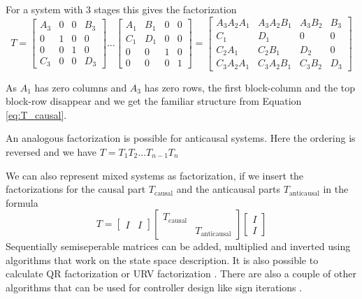 \documentclass[doctype=mastersthesis,BCOR=15mm,biblatex]{ldvbook}%
\newcommand{\eye}{I} %
\begin{document}
For a system with 3 stages this gives the factorization
\begin{equation*}
	T=
	\left[\begin{matrix}A_{3} & 0 & 0 & B_{3}\\0 & 1 & 0 & 0\\0 & 0 & 1 & 0\\C_{3} & 0 & 0 & D_{3}\end{matrix}\right]
\dots
	\left[\begin{matrix}A_{1} & B_{1} & 0 & 0\\C_{1} & D_{1} & 0 & 0\\0 & 0 & 1 & 0\\0 & 0 & 0 & 1\end{matrix}\right]
	=
	\left[\begin{matrix}A_{3} A_{2} A_{1} & A_{3} A_{2} B_{1} & A_{3} B_{2} & B_{3}\\C_{1} & D_{1} & 0 & 0\\C_{2} A_{1} & C_{2} B_{1} & D_{2} & 0\\C_{3} A_{2} A_{1} & C_{3} A_{2} B_{1} & C_{3} B_{2} & D_{3}\end{matrix}\right]
\end{equation*}

As $A_1$ has zero columns and $A_3$ has zero rows, the first block-column and the top block-row disappear and we get the familiar structure from Equation\,\ref{eq:T_causal}.

An analogous factorization is possible for anticausal systems.
Here the ordering is reversed and we have $T = T_1 T_2 \dots T_{n-1} T_{n}$

We can also represent mixed systems as factorization, if we insert the factorizations for the causal part $T_{\text{causal}}$ and the anticausal parts $T_{\text{anticausal}}$ in the formula
\begin{equation}
	T = 
	\begin{bmatrix}
	\eye &
	\eye
	\end{bmatrix}
	\begin{bmatrix}
	T_{\text{causal}}&\\
	&T_{\text{anticausal}}
	\end{bmatrix}	
	\begin{bmatrix}
	\eye\\
	\eye
	\end{bmatrix}
\end{equation}
Sequentially semiseperable matrices can be added, multiplied and inverted using algorithms that work on the state space description.
It is also possible to calculate QR factorization \cite{chandrasekaran_fast_2002,tong_blind_2003} or URV factorization \cite{chandrasekaran_fast_2005}. 
There are also a couple of other algorithms that can be used for controller design like sign iterations \cite{rice_efficient_2010}.
\end{document}
